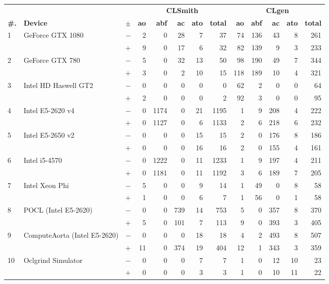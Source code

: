   \begin{tabular}{lll | rrrrr | rrrrr }
  \toprule
  & & & \multicolumn{5}{c|}{\textbf{CLSmith}} & \multicolumn{5}{c}{\textbf{CLgen}} \\
  \textbf{\#.} & \textbf{Device} & $\pm$ &
  \textbf{ao} & \textbf{abf} & \textbf{ac} & \textbf{ato} & \textbf{total} &
  \textbf{ao} & \textbf{abf} & \textbf{ac} & \textbf{ato} & \textbf{total} \\
  \midrule
  \multirow{ 2}{*}{1} & \multirow{ 2}{*}{GeForce GTX 1080} & $-$ & 2 & 0 & 28 & 7 & 37       & 74 & 136 & 43 & 8 & 261 \\& & $+$ & 9 & 0 & 17 & 6 & 32 & 82 & 139 & 9 & 3 & 233 \\
\hline
\multirow{ 2}{*}{2} & \multirow{ 2}{*}{GeForce GTX 780} & $-$ & 5 & 0 & 32 & 13 & 50       & 98 & 190 & 49 & 7 & 344 \\& & $+$ & 3 & 0 & 2 & 10 & 15 & 118 & 189 & 10 & 4 & 321 \\
\hline
\multirow{ 2}{*}{3} & \multirow{ 2}{*}{Intel HD Haswell GT2} & $-$ & 0 & 0 & 0 & 0 & 0       & 62 & 2 & 0 & 0 & 64 \\& & $+$ & 2 & 0 & 0 & 0 & 2 & 92 & 3 & 0 & 0 & 95 \\
\hline
\multirow{ 2}{*}{4} & \multirow{ 2}{*}{Intel E5-2620 v4} & $-$ & 0 & 1174 & 0 & 21 & 1195       & 1 & 9 & 208 & 4 & 222 \\& & $+$ & 0 & 1127 & 0 & 6 & 1133 & 2 & 6 & 218 & 6 & 232 \\
\hline
\multirow{ 2}{*}{5} & \multirow{ 2}{*}{Intel E5-2650 v2} & $-$ & 0 & 0 & 0 & 15 & 15       & 2 & 0 & 176 & 8 & 186 \\& & $+$ & 0 & 0 & 0 & 16 & 16 & 2 & 0 & 155 & 4 & 161 \\
\hline
\multirow{ 2}{*}{6} & \multirow{ 2}{*}{Intel i5-4570} & $-$ & 0 & 1222 & 0 & 11 & 1233       & 1 & 9 & 197 & 4 & 211 \\& & $+$ & 0 & 1181 & 0 & 11 & 1192 & 3 & 6 & 189 & 7 & 205 \\
\hline
\multirow{ 2}{*}{7} & \multirow{ 2}{*}{Intel Xeon Phi} & $-$ & 5 & 0 & 0 & 9 & 14       & 1 & 49 & 0 & 8 & 58 \\& & $+$ & 1 & 0 & 0 & 6 & 7 & 1 & 56 & 0 & 1 & 58 \\
\hline
\multirow{ 2}{*}{8} & \multirow{ 2}{*}{POCL (Intel E5-2620)} & $-$ & 0 & 0 & 739 & 14 & 753       & 5 & 0 & 357 & 8 & 370 \\& & $+$ & 5 & 0 & 101 & 7 & 113 & 9 & 0 & 393 & 3 & 405 \\
\hline
\multirow{ 2}{*}{9} & \multirow{ 2}{*}{ComputeAorta (Intel E5-2620)} & $-$ & 0 & 0 & 0 & 18 & 18       & 4 & 2 & 493 & 8 & 507 \\& & $+$ & 11 & 0 & 374 & 19 & 404 & 12 & 1 & 343 & 3 & 359 \\
\hline
\multirow{ 2}{*}{10} & \multirow{ 2}{*}{Oclgrind Simulator} & $-$ & 0 & 0 & 0 & 7 & 7       & 1 & 0 & 12 & 10 & 23 \\& & $+$ & 0 & 0 & 0 & 3 & 3 & 1 & 0 & 10 & 11 & 22 \\
  \bottomrule
\end{tabular}

